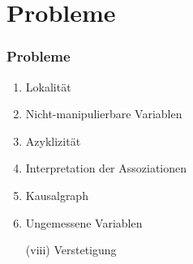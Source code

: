 \documentclass{beamer}
\begin{document}
\section{Probleme}

\begin{frame}
\frametitle{Probleme}

\begin{enumerate}[label = (\roman*)]
\item Lokalität
\item Nicht-manipulierbare Variablen
\item Azyklizität
\item Interpretation der Assoziationen
\item Kausalgraph
\item Ungemessene Variablen
\item[(viii)] Verstetigung 
\end{enumerate}
\end{frame}
\end{document}
